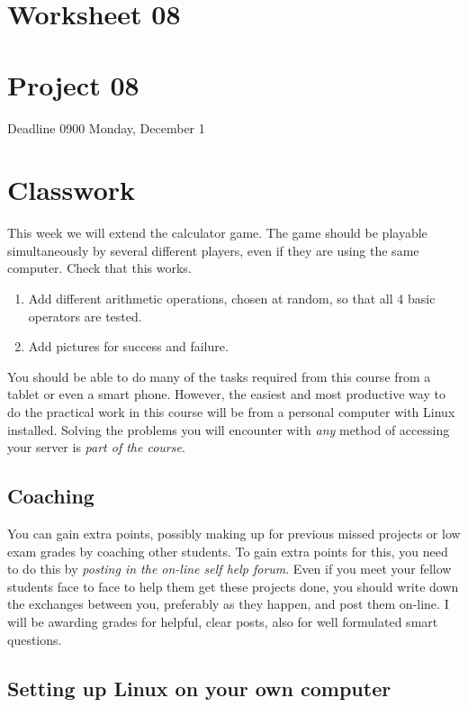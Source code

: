\documentclass[12pt, a4paper]{article}
\begin{document}
\section*{Worksheet 08}
\section*{Project 08} 
Deadline 0900 Monday, December 1


\section*{Classwork}

This week we will extend the calculator game. The game should be playable simultaneously by several different players, even if they are using the same computer. Check that this works.

\begin{enumerate}
 \item Add different arithmetic operations, chosen at random, so that all 4 basic operators are tested.
 \item Add pictures for success and failure.
\end{enumerate}

You should be able to do many of the tasks required from this course from a tablet or even a smart phone. However, the easiest and most productive way to do the practical work in this course will be from a personal computer with Linux installed. Solving the problems you will encounter with \emph{any} method of accessing your server is \emph{part of the course}.

\subsection*{Coaching}

You can gain extra points, possibly making up for previous missed projects or low exam grades by coaching other students. To gain extra points for this, you need to do this by \emph{posting in the on-line self help forum}. Even if you meet your fellow students face to face to help them get these projects done, you should write down the exchanges between you, preferably as they happen, and post them on-line. I will be awarding grades for helpful, clear posts, also for well formulated smart questions. 

\subsection*{Setting up Linux on your own computer}
\end{document}
